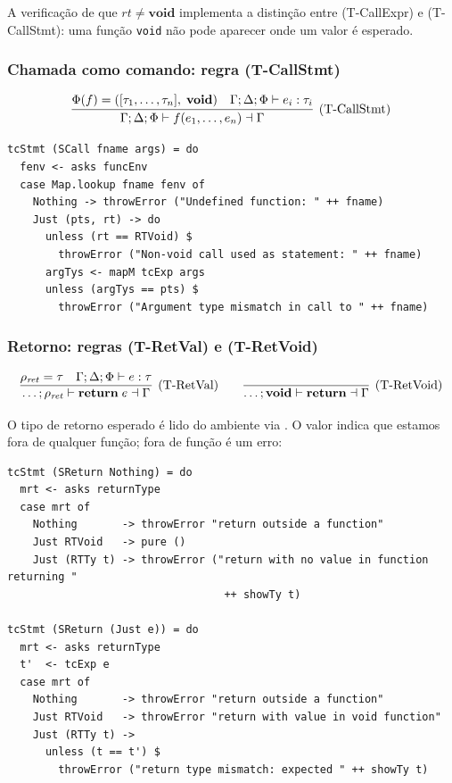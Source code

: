 A verificação de que \(rt \neq \mathbf{void}\) implementa a distinção
entre (T-CallExpr) e (T-CallStmt): uma função \texttt{void} não pode
aparecer onde um valor é esperado.

\subsubsection{Chamada como comando: regra (T-CallStmt)}

\[
  \infer[\text{(T-CallStmt)}]
  {\Gamma;\Delta;\Phi \vdash f(e_1,\ldots,e_n) \dashv \Gamma}
  {\Phi(f) = ([\tau_1,\ldots,\tau_n],\;\mathbf{void})
  \quad \Gamma;\Delta;\Phi \vdash e_i : \tau_i}
\]

\begin{verbatim}
tcStmt (SCall fname args) = do
  fenv <- asks funcEnv
  case Map.lookup fname fenv of
    Nothing -> throwError ("Undefined function: " ++ fname)
    Just (pts, rt) -> do
      unless (rt == RTVoid) $
        throwError ("Non-void call used as statement: " ++ fname)
      argTys <- mapM tcExp args
      unless (argTys == pts) $
        throwError ("Argument type mismatch in call to " ++ fname)
\end{verbatim}

\subsubsection{Retorno: regras (T-RetVal) e (T-RetVoid)}

\[
  \infer[\text{(T-RetVal)}]
  {\ldots;\rho_{\mathit{ret}} \vdash \mathbf{return}\; e \dashv \Gamma}
  {\rho_{\mathit{ret}} = \tau \quad \Gamma;\Delta;\Phi \vdash e : \tau}
  \qquad
  \infer[\text{(T-RetVoid)}]
  {\ldots;\mathbf{void} \vdash \mathbf{return} \dashv \Gamma}
  {}
\]

O tipo de retorno esperado é lido do ambiente via . O valor  indica que estamos fora de
qualquer função;  fora de função é um erro:

\begin{verbatim}
tcStmt (SReturn Nothing) = do
  mrt <- asks returnType
  case mrt of
    Nothing       -> throwError "return outside a function"
    Just RTVoid   -> pure ()
    Just (RTTy t) -> throwError ("return with no value in function returning "
                                  ++ showTy t)

tcStmt (SReturn (Just e)) = do
  mrt <- asks returnType
  t'  <- tcExp e
  case mrt of
    Nothing       -> throwError "return outside a function"
    Just RTVoid   -> throwError "return with value in void function"
    Just (RTTy t) ->
      unless (t == t') $
        throwError ("return type mismatch: expected " ++ showTy t)
\end{verbatim}

